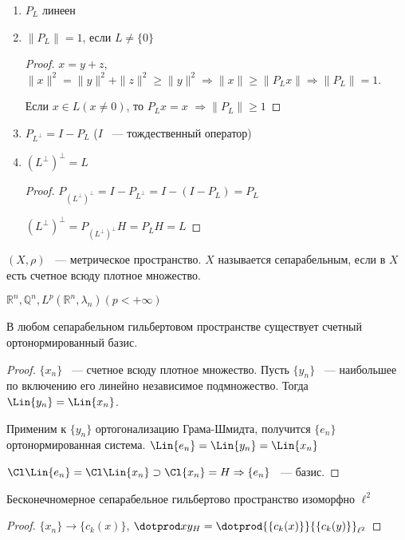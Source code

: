    \begin{properties}
   \begin{enumerate}
   \item $P_L$ линеен
   
   \item $\|P_L\| = 1$, если $L \neq \{0\}$
   
   \begin{proof}
   $x = y + z$, $\|x\|^2 = \|y\|^2 + \|z\|^2 \ge \|y\|^2 \Rightarrow \|x\| \ge \|P_Lx\| \Rightarrow \|P_L\| = 1$.
   
   Если $x \in L (x\neq 0)$, то $P_Lx = x$ $\Rightarrow \|P_L\|\ge 1$
   \end{proof}
   
   \item $P_{L^\perp} = I - P_L$ ($I$ ~--- тождественный оператор)
   
   \item $(L^{\perp})^\perp = L$
   
   \begin{proof}
   $P_{(L^{\perp})^\perp} = I - P_{L^\perp} = I - (I - P_L) = P_L$
   
   $(L^{\perp})^\perp = P_{(L^{\perp})^\perp}H = P_L H = L$
   \end{proof}
   \end{enumerate}
   \end{properties}
   
   \begin{definition} $(X, \rho)$ ~--- метрическое пространство. $X$ называется сепарабельным,
   если в $X$ есть счетное всюду плотное множество.
   \end{definition}
   
   \begin{examples} $\mathbb{R}^n, \mathbb{Q}^n, L^p(\mathbb{R}^n, \lambda_n) (p < +\infty)$
   \end{examples}
   
   \begin{theorem} В любом сепарабельном гильбертовом пространстве существует счетный
   ортонормированный базис.
   
   \end{theorem}
   
   \begin{proof}
   $\{x_n\}$ ~--- счетное всюду плотное множество. Пусть $\{y_n\}$ ~--- наибольшее по 
   включению его линейно независимое подмножество. Тогда $\Lin\{y_n\} = \Lin\{x_n\}$.
   
   Применим к $\{y_n\}$ ортогонализацию Грама-Шмидта, получится $\{e_n\}$ 
   ортонормированная система.  $\Lin\{e_n\} = \Lin\{y_n\} = \Lin\{x_n\}$
   
   $\Cl \Lin\{e_n\} = \Cl \Lin\{x_n\} \supset \Cl \{x_n\} = H \Rightarrow \{e_n\}$ ~--- базис.
   \end{proof}
   
   \begin{theorem} Бесконечномерное сепарабельное гильбертово пространство изоморфно 
   $\ell^2$
   
   \end{theorem}
   
   \begin{proof}
       $\{x_n\}\rightarrow \{c_k(x)\}$, $\dotprod xy_H = 
       \dotprod{\{c_k(x)\}}{\{c_k(y)\}}_{\ell^2}$
   \end{proof}
